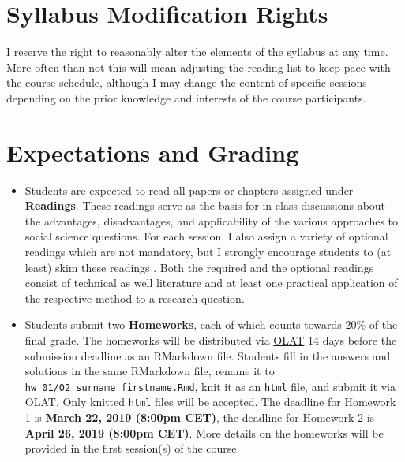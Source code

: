 \documentclass[abstract=on,parskip=full,headings=standardclasses,fontsize=11pt,paper=a4]{scrartcl}
\begin{document}
\section*{Syllabus Modification Rights}

I reserve the right to reasonably alter the elements of the syllabus at any time. More often than not this will mean adjusting the reading list to keep pace with the course schedule, although I may change the content of specific sessions depending on the prior knowledge and interests of the course participants.


\section*{Expectations and Grading}


\begin{itemize}
\item Students are expected to read all papers or chapters assigned under \textbf{Readings}. These readings serve as the basis for in-class discussions about the advantages, disadvantages, and applicability of the various approaches to social science questions. For each session, I also assign a variety of optional readings which are not mandatory, but I strongly encourage students to (at least) skim these readings . Both the required  and the optional readings consist of technical  as well literature and at least one practical application of the respective method to a research question.
\item Students submit two \textbf{Homeworks}, each of which counts towards  20\% of the final grade. The homeworks will be distributed via \href{https://www.id.uzh.ch/de/dl/elearning/services/olatunizh.html}{OLAT} 14 days before the submission deadline as an RMarkdown file. Students fill in the answers and solutions in the same RMarkdown file, rename it  to \texttt{hw\_01/02\_surname\_firstname.Rmd}, knit it as an \texttt{html} file, and submit it via OLAT. Only knitted \texttt{html} files will be accepted. The deadline for Homework 1 is \textbf{March 22, 2019 (8:00pm CET)}, the deadline for Homework 2 is \textbf{April 26, 2019 (8:00pm CET)}. More details on the homeworks will be provided in the first session(s) of the course. 

\end{itemize}
\end{document}
